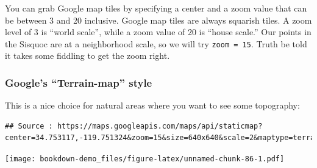 \documentclass[]{book}
\newenvironment{Shaded}{\begin{snugshade}}{\end{snugshade}}
\newcommand{\KeywordTok}[1]{\textcolor[rgb]{0.13,0.29,0.53}{\textbf{{#1}}}}
\newcommand{\DataTypeTok}[1]{\textcolor[rgb]{0.13,0.29,0.53}{{#1}}}
\newcommand{\DecValTok}[1]{\textcolor[rgb]{0.00,0.00,0.81}{{#1}}}
\newcommand{\FloatTok}[1]{\textcolor[rgb]{0.00,0.00,0.81}{{#1}}}
\newcommand{\StringTok}[1]{\textcolor[rgb]{0.31,0.60,0.02}{{#1}}}
\newcommand{\NormalTok}[1]{{#1}}
\theoremstyle{definition}
\theoremstyle{definition}
\theoremstyle{remark}
\begin{document}
You can grab Google map tiles by specifying a center and a zoom value
that can be between 3 and 20 inclusive. Google map tiles are always
squarish tiles. A zoom level of 3 is ``world scale'', while a zoom value
of 20 is ``house scale.'' Our points in the Sisquoc are at a
neighborhood scale, so we will try \texttt{zoom\ =\ 15}. Truth be told
it takes some fiddling to get the zoom right.

\subsubsection{\texorpdfstring{Google's ``Terrain-map''
style}{Google's Terrain-map style}}\label{googles-terrain-map-style}

This is a nice choice for natural areas where you want to see some
topography:

\begin{Shaded}
\end{Shaded}

\begin{verbatim}
## Source : https://maps.googleapis.com/maps/api/staticmap?center=34.753117,-119.751324&zoom=15&size=640x640&scale=2&maptype=terrain
\end{verbatim}

\texttt{[image: bookdown-demo\_files/figure-latex/unnamed-chunk-86-1.pdf]}
\end{document}
